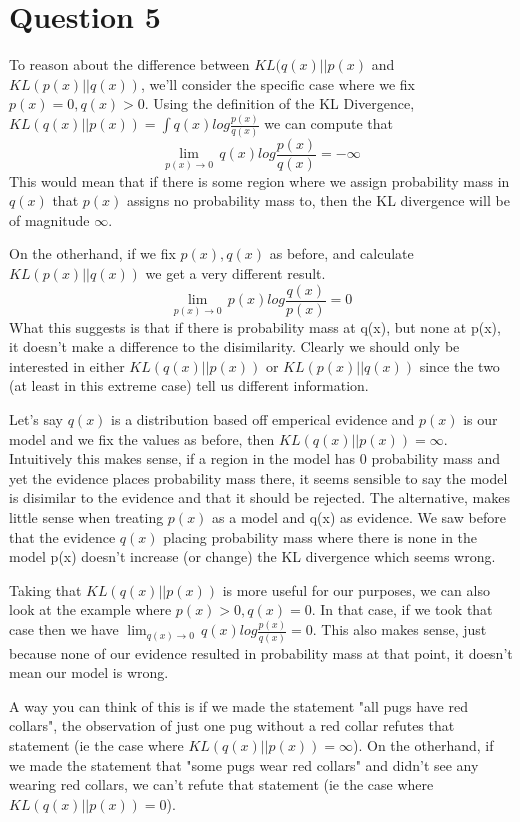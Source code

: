 \documentclass[]{article}
\begin{document}
    \section*{Question 5}
    \par To reason about the difference between $KL(q(x)||p(x)$ and $KL(p(x)||q(x))$, we'll consider the specific case where we fix $p(x) = 0, q(x) > 0$. Using the definition of the KL Divergence, $KL(q(x)||p(x)) = \int q(x) log\frac{p(x)}{q(x)}$ we can compute that $$\lim_{p(x)\rightarrow 0}\, q(x) log \frac{p(x)}{q(x)} = -\infty$$ This would mean that if there is some region where we assign probability mass in $q(x)$ that $p(x)$ assigns no probability mass to, then the KL divergence will be of magnitude $\infty$.
    
    \par On the otherhand, if we fix $p(x), q(x)$ as before, and calculate $KL(p(x)||q(x))$ we get a very different result. $$\lim_{p(x)\rightarrow 0} \, p(x) log \frac{q(x)}{p(x)} = 0$$ What this suggests is that if there is probability mass at q(x), but none at p(x), it doesn't make a difference to the disimilarity. Clearly we should only be interested in either $KL(q(x)||p(x))$ or $KL(p(x)||q(x))$ since the two (at least in this extreme case) tell us different information.
    
    \par Let's say $q(x)$ is a distribution based off emperical evidence and $p(x)$ is our model and we fix the values as before, then $KL(q(x)||p(x)) = \infty$. Intuitively this makes sense, if a region in the model has 0 probability mass and yet the evidence places probability mass there, it seems sensible to say the model is disimilar to the evidence and that it should be rejected. The alternative, makes little sense when treating $p(x)$ as a model and q(x) as evidence. We saw before that the evidence $q(x)$ placing probability mass where there is none in the model p(x) doesn't increase (or change) the KL divergence which seems wrong. 
    
    \par Taking that $KL(q(x)||p(x))$ is more useful for our purposes, we can also look at the example where $p(x)>0, q(x)=0$. In that case, if we took that case then we have $\lim_{q(x)\rightarrow 0} \, q(x) log \frac{p(x)}{q(x)} = 0$. This also makes sense, just because none of our evidence resulted in probability mass at that point, it doesn't mean our model is wrong. 
    
    \par A way you can think of this is if we made the statement "all pugs have red collars", the observation of just one pug without a red collar refutes that statement (ie the case where $KL(q(x)||p(x))=\infty$). On the otherhand, if we made the statement that "some pugs wear red collars" and didn't see any wearing red collars, we can't refute that statement (ie the case where $KL(q(x)||p(x))=0$). \cite{inftheory}
    
\end{document}

